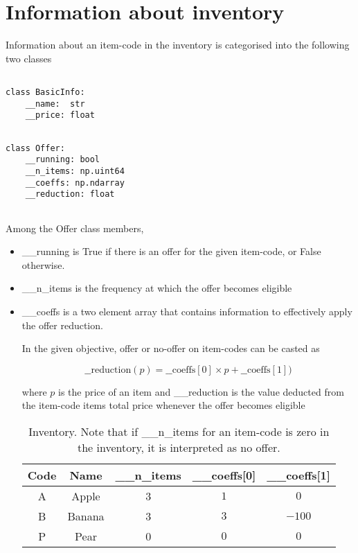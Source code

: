 \documentclass[11pt,a4paper,oneside,onecolumn]{article}
\begin{document}
\section{Information about inventory}

Information about an item-code in the inventory is categorised into the following two classes
\begin{multicols}{2}
	
\begin{verbatim}

class BasicInfo:
    __name:  str 
    __price: float
     
\end{verbatim}

\vfill

\begin{verbatim}
class Offer:
    __running: bool
    __n_items: np.uint64
    __coeffs: np.ndarray
    __reduction: float
    
\end{verbatim}

\end{multicols}

Among the Offer class members,
\begin{itemize}
\item{
\_\_running is True if there is an offer for the given item-code, or False otherwise.
}
\item{\_\_n\_items is the frequency at which the offer becomes eligible}
\item{\_\_coeffs is a two element array that contains information to effectively 
	apply the offer reduction.

In the given objective, offer or no-offer on item-codes can be casted as 

\begin{equation}
\_\_\mathrm{reduction}(p) = \_\_\mathrm{coeffs[0]}\times p+\_\_\mathrm{coeffs[1]})
\end{equation}

where $p$ is the price of an item and \_\_reduction is the value deducted from the
 item-code items total price whenever the offer becomes eligible}

\begin{table}[h]
\begin{center}
\begin{tabular}{ c c c c c }
 \toprule
 Code & Name & \_\_n\_items & \_\_coeffs[0] & \_\_coeffs[1] \\ 
 \midrule
 \midrule
 A & Apple & 3 & $1$ & $0$ \\  
 B & Banana & 3 & $3$ & $-100$ \\
 P & Pear & 0 & $0$ & $0$ \\
 \bottomrule
\end{tabular}
\end{center}
\caption{Inventory. Note that if \_\_n\_items for an item-code is zero in the inventory,
	it is interpreted as no offer.}
\label{tbl:inventory}
\end{table}

\end{itemize}
\end{document}
